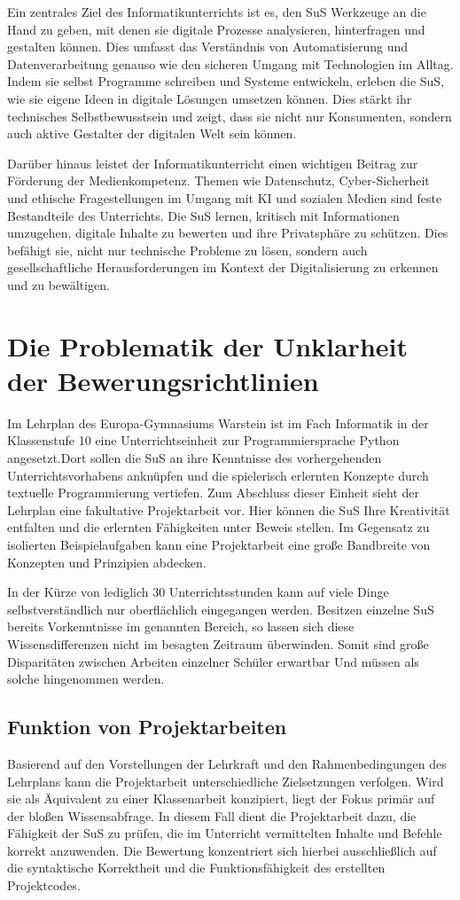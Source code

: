\documentclass[a4paper,12pt]{article}
\begin{document}
Ein zentrales Ziel des Informatikunterrichts ist es, den SuS Werkzeuge an die Hand zu geben, mit denen sie digitale Prozesse analysieren, hinterfragen und gestalten können. Dies umfasst das Verständnis von Automatisierung und Datenverarbeitung genauso wie den sicheren Umgang mit Technologien im Alltag. Indem sie selbst Programme schreiben und Systeme entwickeln, erleben die SuS, wie sie eigene Ideen in digitale Lösungen umsetzen können. Dies stärkt ihr technisches Selbstbewusstsein und zeigt, dass sie nicht nur Konsumenten, sondern auch aktive Gestalter der digitalen Welt sein können.

Darüber hinaus leistet der Informatikunterricht einen wichtigen Beitrag zur Förderung der Medienkompetenz. Themen wie Datenschutz, Cyber-Sicherheit und ethische Fragestellungen im Umgang mit KI und sozialen Medien sind feste Bestandteile des Unterrichts. Die SuS lernen, kritisch mit Informationen umzugehen, digitale Inhalte zu bewerten und ihre Privatsphäre zu schützen. Dies befähigt sie, nicht nur technische Probleme zu lösen, sondern auch gesellschaftliche Herausforderungen im Kontext der Digitalisierung zu erkennen und zu bewältigen.


\section{Die Problematik der Unklarheit der Bewerungsrichtlinien}
Im Lehrplan des Europa-Gymnasiums Warstein ist im Fach Informatik in der Klassenstufe 10 eine Unterrichtseinheit zur Programmiersprache Python angesetzt.Dort sollen die SuS an ihre Kenntnisse des vorhergehenden Unterrichtsvorhabens anknüpfen und die spielerisch erlernten Konzepte durch textuelle Programmierung vertiefen. Zum Abschluss dieser Einheit sieht der Lehrplan eine fakultative Projektarbeit vor. Hier können die SuS Ihre Kreativität entfalten und die erlernten Fähigkeiten unter Beweis stellen. Im Gegensatz zu isolierten Beispielaufgaben kann eine Projektarbeit eine große Bandbreite von Konzepten und Prinzipien abdecken.

In der Kürze von lediglich 30 Unterrichtsstunden kann auf viele Dinge selbstverständlich nur oberflächlich eingegangen werden. Besitzen einzelne SuS bereits Vorkenntnisse im genannten Bereich, so lassen sich diese Wissensdifferenzen nicht im besagten Zeitraum überwinden. Somit sind große Disparitäten zwischen Arbeiten einzelner Schüler erwartbar Und müssen als solche hingenommen werden.


\subsection{Funktion von Projektarbeiten}
Basierend auf den Vorstellungen der Lehrkraft und den Rahmenbedingungen des Lehrplans kann die Projektarbeit unterschiedliche Zielsetzungen verfolgen. Wird sie als Äquivalent zu einer Klassenarbeit konzipiert, liegt der Fokus primär auf der bloßen Wissensabfrage. In diesem Fall dient die Projektarbeit dazu, die Fähigkeit der SuS zu prüfen, die im Unterricht vermittelten Inhalte und Befehle korrekt anzuwenden. Die Bewertung konzentriert sich hierbei ausschließlich auf die syntaktische Korrektheit und die Funktionsfähigkeit des erstellten Projektcodes.
\end{document}
